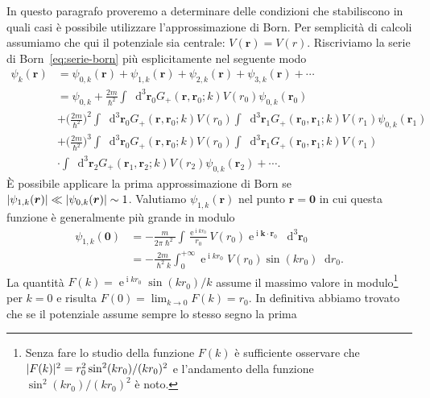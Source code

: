 \documentclass[a4paper,fleqn,twoside,12pt]{article}
\newcommand*{\dd}{\mathop{}\!\mathrm{d}} %
\DeclareMathOperator{\e}{\mathrm{e}} %
\DeclareMathOperator{\uimm}{\mathrm{i}} %
\DeclarePairedDelimiter{\abs}{\lvert}{\rvert}
\begin{document}
In questo paragrafo proveremo a determinare delle condizioni che stabiliscono in
quali casi è possibile utilizzare l'approssimazione di Born.  Per semplicità di
calcoli assumiamo che qui il potenziale sia centrale: $V(\bm{r}) = V(r)$.
Riscriviamo la serie di Born~\eqref{eq:serie-born} più esplicitamente nel
seguente modo
\begin{equation}
  \begin{split}
    \psi_{k}(\bm{r}) &= \psi_{0,k}(\bm{r}) + \psi_{1,k}(\bm{r}) +
    \psi_{2,k}(\bm{r}) + \psi_{3,k}(\bm{r}) + \cdots \\
    &=\psi_{0,k} + \frac{2 m}{\hslash^{2}}\int\dd^{3}\bm{r}_{0}
    G_{+}(\bm{r},\bm{r}_{0};k) V(r_{0}) \psi_{0,k}(\bm{r}_{0}) \\
    &+ \bigg(\frac{2m}{\hslash^{2}}\bigg)^{2}
    \int\dd^{3}\bm{r}_{0}G_{+}(\bm{r},\bm{r}_{0};k)
    V(r_{0})\int\dd^{3}\bm{r}_{1} G_{+}(\bm{r}_{0},\bm{r}_{1};k) V(r_{1})
    \psi_{0,k}(\bm{r}_{1}) \\
    &+ \bigg(\frac{2m}{\hslash^{2}}\bigg)^{3}
    \int\dd^{3}\bm{r}_{0}G_{+}(\bm{r},\bm{r}_{0};k)
    V(r_{0})\int\dd^{3}\bm{r}_{1} G_{+}(\bm{r}_{0},\bm{r}_{1};k) V(r_{1}) \\
    &\cdot\int\dd^{3}\bm{r}_{2} G_{+}(\bm{r}_{1},\bm{r}_{2};k) V(r_{2})
    \psi_{0,k}(\bm{r}_{2}) + \cdots.
  \end{split}
\end{equation}
È possibile applicare la prima approssimazione di Born se
$\abs{\psi_{1,k}(\bm{r})} \ll \abs{\psi_{0,k}(\bm{r})} \sim 1$.  Valutiamo
$\psi_{1,k}(\bm{r})$ nel punto $\bm{r} = \bm{0}$ in cui questa funzione è
generalmente più grande in modulo
\begin{equation}
  \begin{split}
    \psi_{1,k}(\bm{0}) &= -\frac{m}{2\pi\hslash^{2}}\int \frac{\e^{\uimm
        kr_{0}}}{r_{0}} V(r_{0}) \e^{\uimm \bm{k}\cdot\bm{r}_{0}}
    \dd^{3}\bm{r}_{0} \\
    &= -\frac{2m}{\hslash^{2}k} \int_{0}^{+\infty} \e^{\uimm kr_{0}}V(r_{0})
    \sin(kr_{0}) \dd r_{0}.
  \end{split}
\end{equation}
La quantità $F(k)=\e^{\uimm kr_{0}}\sin(kr_{0})/k$ assume il massimo valore in
modulo\footnote{Senza fare lo studio della funzione $F(k)$ è sufficiente
  osservare che $\abs{F(k)}^{2} = r_{0}^{2} \sin^{2}(kr_{0})/(kr_{0})^{2}$ e
  l'andamento della funzione $\sin^{2}(kr_{0})/(kr_{0})^{2}$ è noto.}
per $k = 0$ e risulta $F(0) = \lim_{k \to 0} F(k) = r_{0}$.  In definitiva
abbiamo trovato che se il potenziale assume sempre lo stesso segno la prima
\end{document}
